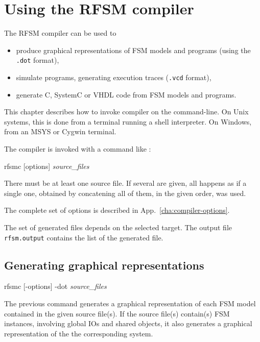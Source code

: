 \chapter{Using the RFSM compiler}
\label{cha:rfsmc}

The RFSM compiler can be used to
\begin{itemize}
\item produce graphical representations of FSM models and programs (using the \verb|.dot| format),
\item simulate programs, generating execution traces (\verb|.vcd| format),
\item generate C, SystemC or VHDL code from FSM models and programs.
\end{itemize}

This chapter describes how to invoke compiler on the command-line. On Unix systems, this is
done from a terminal running a shell interpreter. On Windows, from an MSYS or Cygwin
terminal.

\medskip
The compiler is invoked with a command like :

\begin{FVerbatim}[commandchars=\\\{\}]
rfsmc [options] \emph{source_files}
\end{FVerbatim}

\medskip
There must be at least one source file. If several are given, all happens as if a single one,
obtained by concatening all of them, in the given order, was used. 

\medskip
The complete set of options is described in App.~\ref{cha:compiler-options}.

\medskip
The set of generated files depends on the selected target. The output file \texttt{rfsm.output}
contains the list of the generated file.

\section{Generating graphical representations}
\label{sec:gener-graph-repr}

\begin{FVerbatim}[commandchars=\\\{\}]
rfsmc [-options] -dot \emph{source_files}
\end{FVerbatim}

The previous command generates a graphical representation of each FSM model 
contained in the given source file(s). If the source file(s) contain(s) FSM instances, involving global IOs
and shared objects, it also generates a graphical representation of the the corresponding system. 

